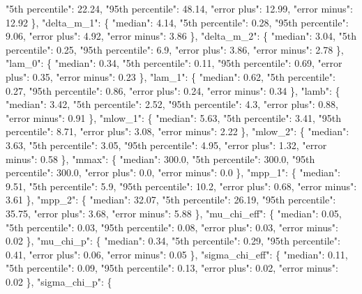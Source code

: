 {{        "5th percentile": 22.24, %
        "95th percentile": 48.14, %
        "error plus": 12.99, %
        "error minus": 12.92%
      \}, %
      "delta\_m\_1": \{%
        "median": 4.14, %
        "5th percentile": 0.28, %
        "95th percentile": 9.06, %
        "error plus": 4.92, %
        "error minus": 3.86%
      \}, %
      "delta\_m\_2": \{%
        "median": 3.04, %
        "5th percentile": 0.25, %
        "95th percentile": 6.9, %
        "error plus": 3.86, %
        "error minus": 2.78%
      \}, %
      "lam\_0": \{%
        "median": 0.34, %
        "5th percentile": 0.11, %
        "95th percentile": 0.69, %
        "error plus": 0.35, %
        "error minus": 0.23%
      \}, %
      "lam\_1": \{%
        "median": 0.62, %
        "5th percentile": 0.27, %
        "95th percentile": 0.86, %
        "error plus": 0.24, %
        "error minus": 0.34%
      \}, %
      "lamb": \{%
        "median": 3.42, %
        "5th percentile": 2.52, %
        "95th percentile": 4.3, %
        "error plus": 0.88, %
        "error minus": 0.91%
      \}, %
      "mlow\_1": \{%
        "median": 5.63, %
        "5th percentile": 3.41, %
        "95th percentile": 8.71, %
        "error plus": 3.08, %
        "error minus": 2.22%
      \}, %
      "mlow\_2": \{%
        "median": 3.63, %
        "5th percentile": 3.05, %
        "95th percentile": 4.95, %
        "error plus": 1.32, %
        "error minus": 0.58%
      \}, %
      "mmax": \{%
        "median": 300.0, %
        "5th percentile": 300.0, %
        "95th percentile": 300.0, %
        "error plus": 0.0, %
        "error minus": 0.0%
      \}, %
      "mpp\_1": \{%
        "median": 9.51, %
        "5th percentile": 5.9, %
        "95th percentile": 10.2, %
        "error plus": 0.68, %
        "error minus": 3.61%
      \}, %
      "mpp\_2": \{%
        "median": 32.07, %
        "5th percentile": 26.19, %
        "95th percentile": 35.75, %
        "error plus": 3.68, %
        "error minus": 5.88%
      \}, %
      "mu\_chi\_eff": \{%
        "median": 0.05, %
        "5th percentile": 0.03, %
        "95th percentile": 0.08, %
        "error plus": 0.03, %
        "error minus": 0.02%
      \}, %
      "mu\_chi\_p": \{%
        "median": 0.34, %
        "5th percentile": 0.29, %
        "95th percentile": 0.41, %
        "error plus": 0.06, %
        "error minus": 0.05%
      \}, %
      "sigma\_chi\_eff": \{%
        "median": 0.11, %
        "5th percentile": 0.09, %
        "95th percentile": 0.13, %
        "error plus": 0.02, %
        "error minus": 0.02%
      \}, %
      "sigma\_chi\_p": \{%
}}
